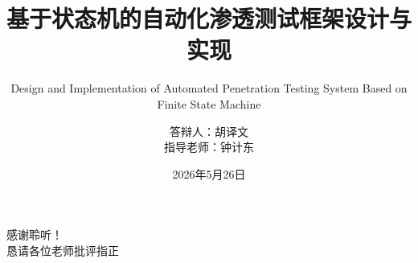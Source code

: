 \documentclass[aspectratio=169]{ctexbeamer}
\title[AutoPT+ 自动化渗透测试]{基于状态机的自动化渗透测试框架设计与实现}
\subtitle{Design and Implementation of Automated Penetration Testing System Based on Finite State Machine}
\author[胡译文]{
    答辩人：胡译文 \\
    指导老师：钟计东
}
\institute[信安，同济大学]{
    信息安全专业 \\
    同济大学
}
\date{2026年5月26日}
\begin{document}
\begin{frame}
    \titlepage
\end{frame}





\begin{frame}
    \begin{center}
        \Huge 感谢聆听！\\[1em]
        \large 恳请各位老师批评指正
    \end{center}
\end{frame}
\end{document}

